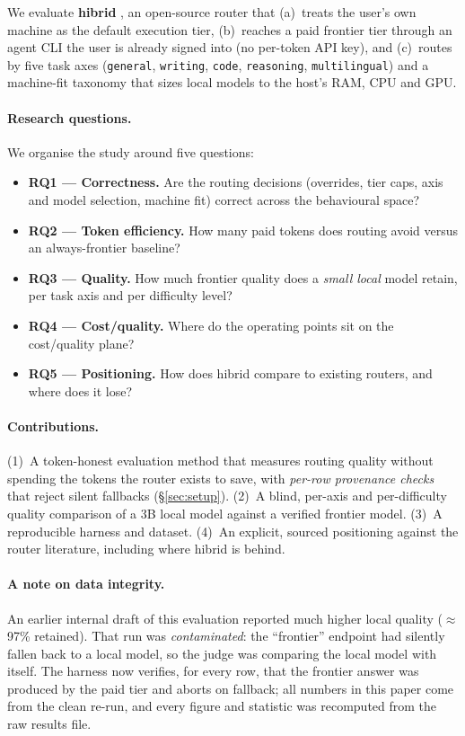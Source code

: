 \documentclass[10pt]{article} %
\begin{document}
We evaluate \textbf{hibrid} \citep{hibrid2026}, an open-source router that (a)~treats the user's own machine as the default execution tier, (b)~reaches a paid frontier tier through an agent CLI the user is already signed into (no per-token API key), and (c)~routes by five task axes (\texttt{general}, \texttt{writing}, \texttt{code}, \texttt{reasoning}, \texttt{multilingual}) and a machine-fit taxonomy that sizes local models to the host's RAM, CPU and GPU.

\paragraph{Research questions.} We organise the study around five questions:
\begin{itemize}
  \item \textbf{RQ1 --- Correctness.} Are the routing decisions (overrides, tier caps, axis and model selection, machine fit) correct across the behavioural space?
  \item \textbf{RQ2 --- Token efficiency.} How many paid tokens does routing avoid versus an always-frontier baseline?
  \item \textbf{RQ3 --- Quality.} How much frontier quality does a \emph{small local} model retain, per task axis and per difficulty level?
  \item \textbf{RQ4 --- Cost/quality.} Where do the operating points sit on the cost/quality plane?
  \item \textbf{RQ5 --- Positioning.} How does hibrid compare to existing routers, and where does it lose?
\end{itemize}

\paragraph{Contributions.} (1)~A token-honest evaluation method that measures routing quality without spending the tokens the router exists to save, with \emph{per-row provenance checks} that reject silent fallbacks (\S\ref{sec:setup}). (2)~A blind, per-axis and per-difficulty quality comparison of a 3B local model against a verified frontier model. (3)~A reproducible harness and dataset. (4)~An explicit, sourced positioning against the router literature, including where hibrid is behind.

\paragraph{A note on data integrity.} An earlier internal draft of this evaluation reported much higher local quality ($\approx$97\% retained). That run was \emph{contaminated}: the ``frontier'' endpoint had silently fallen back to a local model, so the judge was comparing the local model with itself. The harness now verifies, for every row, that the frontier answer was produced by the paid tier and aborts on fallback; all numbers in this paper come from the clean re-run, and every figure and statistic was recomputed from the raw results file.
\end{document}
